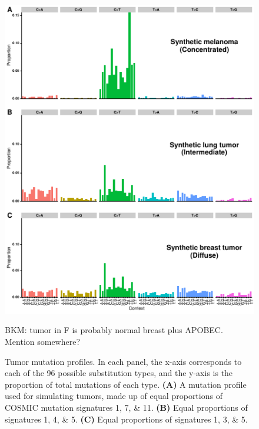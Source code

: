 \documentclass[a4,center,fleqn]{NAR}
\newcommand{\bkmcomment}[1]{{\color{blue}BKM: #1}}
\begin{document}
\begin{figure}
  \begin{center}
  \includegraphics{figures/sim_signatures_only.pdf}
  \end{center}
  \bkmcomment{tumor in F is probably normal breast plus APOBEC. Mention somewhere?}
  \caption{Tumor mutation profiles.
  In each panel, the x-axis corresponds to each of the 96 possible substitution types, and the y-axis is the proportion of total mutations of each type.
  \textbf{(A)} A mutation profile used for simulating tumors, made up of equal proportions of COSMIC mutation signatures 1, 7, \& 11.
  \textbf{(B)} Equal proportions of signatures 1, 4, \& 5.
  \textbf{(C)} Equal proportions of signatures 1, 3, \& 5.
   }
  \label{NAR-simsigfig}
 \end{figure}
\end{document}
